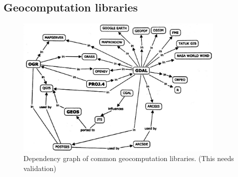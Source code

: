 







\subsection{Geocomputation libraries}

\begin{figure}
  \centering
  \graphicspath{ {../../assets/images/background} }
  \includegraphics[width=380px]{all-geo-libraries-explained.jpg}
  \caption{Dependency graph of common geocomputation libraries. (This needs validation) }
  \label{fig:geolib-dependencies}
\end{figure}


